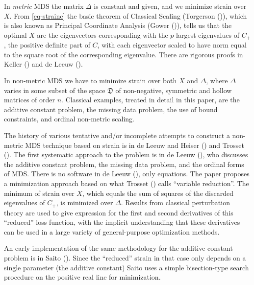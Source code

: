 \documentclass[
  12pt,
  letterpaper,
  DIV=11,
  numbers=noendperiod]{scrartcl}
\begin{document}
In \emph{metric} MDS the matrix \(\Delta\) is constant and given, and we
minimize strain over \(X\). From \eqref{eq-strainc} the basic theorem of
Classical Scaling (Torgerson ()), which
is also known as Principal Coordinate Analysis (Gower
()), tells us that the optimal \(X\) are
the eigenvectors corresponding with the \(p\) largest eigenvalues of
\(C_+\), the positive definite part of \(C\), with each eigenvector
scaled to have norm equal to the square root of the corresponding
eigenvalue. There are rigorous proofs in Keller
() and {de Leeuw}
().

In non-metric MDS we have to minimize strain over both \(X\) and
\(\Delta\), where \(\Delta\) varies in some subset of the space
\(\mathfrak{D}\) of non-negative, symmetric and hollow matrices of order
\(n\). Classical examples, treated in detail in this paper, are the
additive constant problem, the missing data problem, the use of bound
constraints, and ordinal non-metric scaling.

The history of various tentative and/or incomplete attempts to construct
a non-metric MDS technique based on strain is in {de Leeuw and Heiser}
() and Trosset
(). The first systematic approach to the
problem is in {de Leeuw} (), who
discusses the additive constant problem, the missing data problem, and
the ordinal forms of MDS. There is no software in {de Leeuw}
(), only equations. The paper
proposes a minimization approach based on what Trosset
() calls ``variable reduction''. The
minimum of strain over \(X\), which equals the sum of squares of the
discarded eigenvalues of \(C_+\), is minimized over \(\Delta\). Results
from classical perturbation theory are used to give expression for the
first and second derivatives of this ``reduced'' loss function, with the
implicit understanding that these derivatives can be used in a large
variety of general-purpose optimization methods.

An early implementation of the same methodology for the additive
constant problem is in Saito (). Since the
``reduced'' strain in that case only depends on a single parameter (the
additive constant) Saito uses a simple bisection-type search procedure
on the positive real line for minimization.
\end{document}
